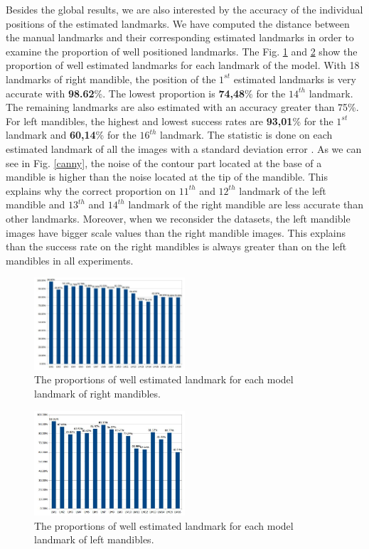 \documentclass[twoside,twocolumn,10pt]{article}
\begin{document}
Besides the global results, we are also interested by the accuracy of
the individual positions of the estimated landmarks.
We have computed the distance between the manual landmarks and their
corresponding estimated landmarks in order to examine the proportion
of well positioned landmarks. The Fig. \ref{figmdresultlm} and
\ref{figmgresultlm} show the proportion of well estimated landmarks
for each landmark of the model. With 18 landmarks of right mandible,
the position of the $1^{st}$ estimated landmarks is very accurate with
\textbf{98.62}\%. The lowest proportion is \textbf{74,48}\% for the
$14^{th}$ landmark. The remaining landmarks are also estimated with an
accuracy greater than 75\%. For left mandibles, the highest and lowest success rates are
\textbf{93,01}\% for the $1^{st}$ landmark and \textbf{60,14}\% for
the $16^{th}$ landmark. The statistic is done on each estimated
landmark of all the images with a standard deviation error
\cite{bland1996statistics}. As we can see in Fig. \ref{canny}, the
noise of the contour part located at the base of a mandible is higher
than the noise located at the tip of the mandible. 
This explains why the correct proportion on $11^{th}$ and $12^{th}$
landmark of the left mandible and $13^{th}$ and $14^{th}$ landmark of
the right mandible are less accurate than other landmarks. Moreover,
when we reconsider the datasets, the left mandible images have bigger
scale values than the right mandible images. This explains than the
success rate on the right mandibles is always greater than on the left
mandibles in all experiments.

\begin{figure}[htb]
    \centering
    \includegraphics[width=0.5\textwidth]{./images/md_chartlms}
    \caption{The proportions of well estimated landmark for each model landmark of right mandibles.}
    \label{figmdresultlm}
\end{figure}
\begin{figure}[htb]
    \centering
    \includegraphics[width=0.5\textwidth]{./images/mg_chartlms}
    \caption{The proportions of well estimated landmark for each model landmark of left mandibles.}
    \label{figmgresultlm}
\end{figure}
\end{document}
